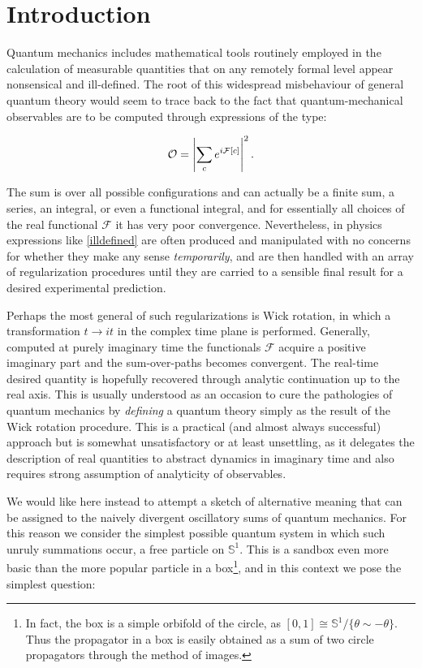 \documentclass{article}
\begin{document}
\tableofcontents

\pagebreak

\section{Introduction}

Quantum mechanics includes mathematical tools routinely employed in the calculation of measurable quantities that on any remotely formal level appear nonsensical and ill-defined. The root of this widespread misbehaviour of general quantum theory would seem to trace back to the fact that quantum-mechanical observables are to be computed through expressions of the type:

\begin{equation}\label{illdefined}
    \mathcal{O} = \abs{ \sum_{c} e^{i\mathcal{F}[c]} }^2\,.
\end{equation}

The sum is over all possible configurations and can actually be a finite sum, a series, an integral, or even a functional integral, and for essentially all choices of the real functional $\mathcal{F}$ it has very poor convergence. Nevertheless, in physics expressions like \eqref{illdefined} are often produced and manipulated with no concerns for whether they make any sense \emph{temporarily}, and are then handled with an array of regularization procedures until they are carried to a sensible final result for a desired experimental prediction.

Perhaps the most general of such regularizations is Wick rotation, in which a transformation $t \rightarrow it$ in the complex time plane is performed. Generally, computed at purely imaginary time the functionals $\mathcal{F}$ acquire a positive imaginary part and the sum-over-paths becomes convergent. The real-time desired quantity is hopefully recovered through analytic continuation up to the real axis. This is usually understood as an occasion to cure the pathologies of quantum mechanics by \emph{defining} a quantum theory simply as the result of the Wick rotation procedure. This is a practical (and almost always successful) approach but is somewhat unsatisfactory or at least unsettling, as it delegates the description of real quantities to abstract dynamics in imaginary time and also requires strong assumption of analyticity of observables.

We would like here instead to attempt a sketch of alternative meaning that can be assigned to the naively divergent oscillatory sums of quantum mechanics. For this reason we consider the simplest possible quantum system in which such unruly summations occur, a free particle on $\mathbb{S}^1$. This is a sandbox even more basic than the more popular particle in a box\footnote{In fact, the box is a simple orbifold of the circle, as $[0,1] \cong \mathbb{S}^1/\{\theta \sim - \theta\}$. Thus the propagator in a box is easily obtained as a sum of two circle propagators through the method of images.}, and in this context we pose the simplest question:
\end{document}
